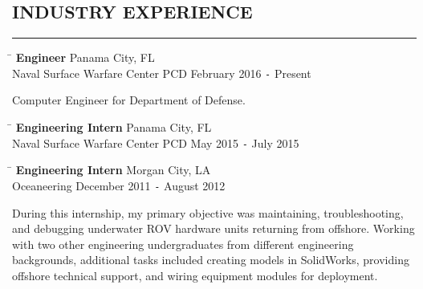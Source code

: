 \documentclass{res}
\begin{document}
\begin{resume}
\section{INDUSTRY EXPERIENCE}
	\vspace{0.005in}	
	\rule{\textwidth}{0.5pt}
	\vspace{-0.4in}
	\begin{tabbing}
		\hspace{4.652in}\= \kill %
		{\bf Engineer} \> \hspace{0.3in}Panama City, FL  \\  
		Naval Surface Warfare Center PCD \>\hspace{-0.18in} February 2016 \texttt{-} Present	
	\end{tabbing}\vspace{-20pt}      %
	\vspace{8pt} Computer Engineer for Department of Defense.
	\vspace{-0.2in}\begin{tabbing}
		\hspace{4.652in}\= \kill %
		{\bf Engineering Intern} \> \hspace{0.3in}Panama City, FL  \\  
		 Naval Surface Warfare Center PCD \> May 2015 \texttt{-} July 2015	
	\end{tabbing}\vspace{-20pt}      %
	\vspace{8pt}
	\vspace{-0.2in}
	\begin{tabbing}
		\hspace{4.155in}\=  \kill %
		{\bf Engineering Intern} \> \hspace{0.815in}Morgan City, LA \\
		Oceaneering \>December 2011 \texttt{-} August 2012
	\end{tabbing}\vspace{-20pt}
	\vspace{8pt}During this internship, my primary objective was maintaining, troubleshooting, and debugging underwater ROV hardware units returning from offshore. Working with two other engineering undergraduates from different engineering backgrounds, additional tasks included creating models in SolidWorks, providing offshore technical support, and wiring equipment modules for deployment.


\end{resume}
\end{document}
